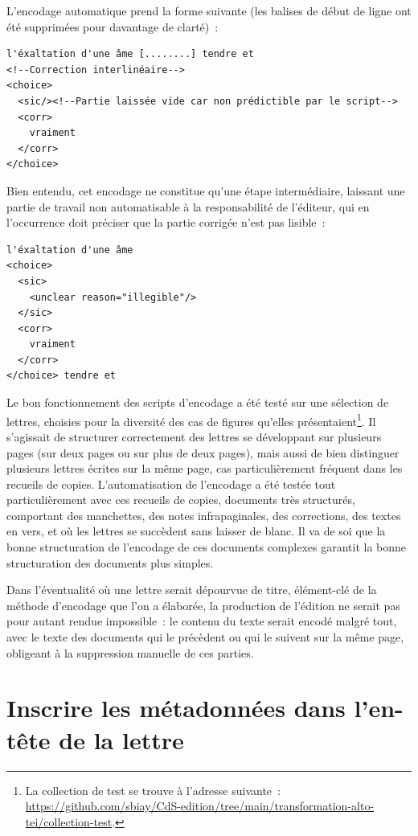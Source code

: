 \documentclass[a4paper,12pt,twoside]{book}
\begin{document}
			L'encodage automatique prend la forme suivante (les balises de début de ligne ont été supprimées pour davantage de clarté)~:
			
			\begin{verbatim}
l'éxaltation d'une âme [........] tendre et
<!--Correction interlinéaire-->
<choice>
  <sic/><!--Partie laissée vide car non prédictible par le script-->
  <corr>
    vraiment
  </corr>
</choice>
			\end{verbatim}
			
			Bien entendu, cet encodage ne constitue qu'une étape intermédiaire, laissant une partie de travail non automatisable à la responsabilité de l'éditeur, qui en l'occurrence doit préciser que la partie corrigée n'est pas lisible~:
			
			\begin{verbatim}
l'éxaltation d'une âme 
<choice>
  <sic>
    <unclear reason="illegible"/>
  </sic>
  <corr>
    vraiment
  </corr>
</choice> tendre et
			\end{verbatim}
		
			Le bon fonctionnement des scripts d'encodage a été testé sur une sélection de lettres, choisies pour la diversité des cas de figures qu'elles présentaient\footnote{La collection de test se trouve à l'adresse suivante~: \url{https://github.com/sbiay/CdS-edition/tree/main/transformation-alto-tei/collection-test}.}. Il s'agissait de structurer correctement des lettres se développant sur plusieurs pages (sur deux pages ou sur plus de deux pages), mais aussi de bien distinguer plusieurs lettres écrites sur la même page, cas particulièrement fréquent dans les recueils de copies. L'automatisation de l'encodage a été testée tout particulièrement avec ces recueils de copies, documents très structurés, comportant des manchettes, des notes infrapaginales, des corrections, des textes en vers, et où les lettres se succèdent sans laisser de blanc. Il va de soi que la bonne structuration de l'encodage de ces documents complexes garantit la bonne structuration des documents plus simples. 
			
			Dans l'éventualité où une lettre serait dépourvue de titre, élément-clé de la méthode d'encodage que l'on a élaborée, la production de l'édition ne serait pas pour autant rendue impossible~: le contenu du texte serait encodé malgré tout, avec le texte des documents qui le précèdent ou qui le suivent sur la même page, obligeant à la suppression manuelle de ces parties.
			
		\section{Inscrire les métadonnées dans l'en-tête de la lettre}
		
\end{document}
